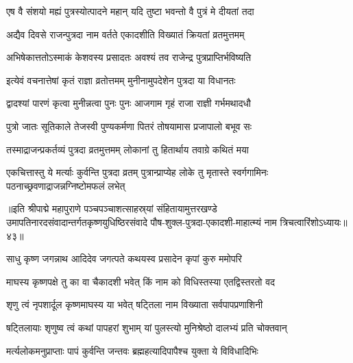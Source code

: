 
\twolineshloka
{एष वै संशयो मह्यं पुत्रस्योत्पादने महान्}
{यदि तुष्टा भवन्तो वै पुत्रं मे दीयतां तदा}%


\twolineshloka
{अद्यैव दिवसे राजन्पुत्रदा नाम वर्तते}
{एकादशीति विख्यातं क्रियतां व्रतमुत्तमम्}%

\twolineshloka
{अभिषेकात्ततोऽस्माकं केशवस्य प्रसादतः}
{अवश्यं तव राजेन्द्र पुत्रप्राप्तिर्भविष्यति}%

\twolineshloka
{इत्येवं वचनात्तेषां कृतं राज्ञा व्रतोत्तमम्}
{मुनीनामुपदेशेन पुत्रदा या विधानतः}%

\twolineshloka
{द्वादश्यां पारणं कृत्वा मुनीन्नत्वा पुनः पुनः}
{आजगाम गृहं राजा राज्ञी गर्भमथादधौ}%

\twolineshloka
{पुत्रो जातः सूतिकाले तेजस्वी पुण्यकर्मणा}
{पितरं तोषयामास प्रजापालो बभूव सः}%

\twolineshloka
{तस्माद्राजन्प्रकर्तव्यं पुत्रदा व्रतमुत्तमम्}
{लोकानां तु हितार्थाय तवाग्रे कथितं मया}%

\threelineshloka
{एकचित्तास्तु ये मर्त्याः कुर्वन्ति पुत्रदा व्रतम्}
{पुत्रान्प्राप्येह लोके तु मृतास्ते स्वर्गगामिनः}
{पठनाच्छ्रवणाद्राजन्नग्निष्टोमफलं लभेत्}%

॥इति श्रीपाद्मे महापुराणे पञ्चपञ्चाशत्साहस्र्यां संहितायामुत्तरखण्डे उमापतिनारदसंवादान्तर्गतकृष्णयुधिष्ठिरसंवादे पौष-शुक्ल-पुत्रदा-एकादशी-माहात्म्यं नाम त्रिचत्वारिंशोऽध्यायः॥४३॥


\hyperref[sec:ekadashi_mahatmyam_padma_puranam]{\closesub}
\clearpage

\label{sec:padma-magha-krishna-shattila}



\twolineshloka
{साधु कृष्ण जगन्नाथ आदिदेव जगत्पते}
{कथयस्व प्रसादेन कृपां कुरु ममोपरि}%

\twolineshloka
{माघस्य कृष्णपक्षे तु का वा चैकादशी भवेत्}
{किं नाम को विधिस्तस्या  एतद्विस्तरतो वद}%


\twolineshloka
{शृणु त्वं नृपशार्दूल कृष्णमाघस्य या भवेत्}
{षट्तिला नाम विख्याता सर्वपापप्रणाशिनी}%

\twolineshloka
{षट्तिलायाः शृणुष्व त्वं कथां पापहरां शुभाम्}
{यां पुलस्त्यो मुनिश्रेष्ठो दालभ्यं प्रति चोक्तवान्}%


\twolineshloka
{मर्त्यलोकमनुप्राप्ताः पापं कुर्वन्ति जन्तवः}
{ब्रह्महत्यादिपापैश्च युक्ता ये विविधादिभिः}%

